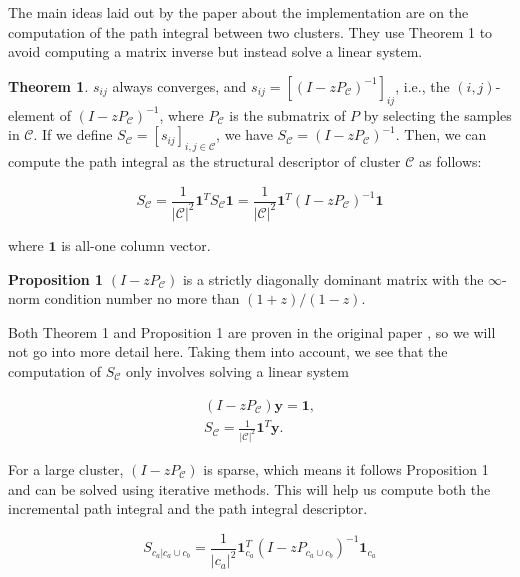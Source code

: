 \documentclass[
	10pt,
	parskip=half-,	
	paper=a4,
	english
	]{scrartcl}
\begin{document}
The main ideas laid out by the paper about the implementation are on the computation of the path integral between two clusters. They use Theorem 1 to avoid computing a matrix inverse but instead solve a linear system. 

\textbf{Theorem 1}. $s_{ij}$ always converges, and $s_{ij}= \left[(I - zP_{\mathcal{C}})^{-1}\right]_{ij}$, i.e., the $(i,j)$-element of $(I-zP_{\mathcal{C}})^{-1}$, where $P_{\mathcal{C}}$ is the submatrix of $P$ by selecting the samples in $\mathcal{C}$. If we define $S_{\mathcal{C}} = [s_{ij}]_{i,j \in \mathcal{C}}$, we have $S_{\mathcal{C}} = (I - zP_{\mathcal{C}})^{-1}$. Then, we can compute the path integral as the structural descriptor of cluster $\mathcal{C}$ as follows:

\begin{equation}
    S_{\mathcal{C}} = \frac{1}{|\mathcal{C}|^2} \mathbf{1}^{T} S_{\mathcal{C}} \mathbf{1}
    = \frac{1}{|\mathcal{C}|^2} \mathbf{1}^{T} (I - zP_{\mathcal{C}})^{-1} \mathbf{1}
    \label{eq8}
\end{equation}

where $\mathbf{1}$ is all-one column vector.

\textbf{Proposition 1} $(I - zP_{\mathcal{C}})$ is a strictly diagonally dominant matrix with the $\infty$-norm condition number no more than $(1+z)/(1-z)$.

Both Theorem 1 and Proposition 1 are proven in the original paper \cite{citation1}, so we will not go into more detail here. Taking them into account, we see that the computation of $S_{\mathcal{C}}$ only involves solving a linear system

\begin{equation}
    \begin{split}
    (I - zP_{\mathcal{C}}) \mathbf{y} = \mathbf{1},
    \label{eq7}
    \\
    S_{\mathcal{C}} = \frac{1}{|\mathcal{C}|^2} \mathbf{1}^{T} \mathbf{y}.
    \end{split}
\end{equation}

For a large cluster, $(I - zP_{\mathcal{C}})$ is sparse, which means it follows Proposition 1 and can be solved using iterative methods. This will help us compute both the incremental path integral and the path integral descriptor.

\begin{equation}
    S_{c_a|c_a \cup c_b} = \frac{1}{|c_a|^2} \mathbf{1}_{c_a}^{T} (I - zP_{c_a \cup c_b})^{-1} \mathbf{1}_{c_a}
\end{equation}
\end{document}
